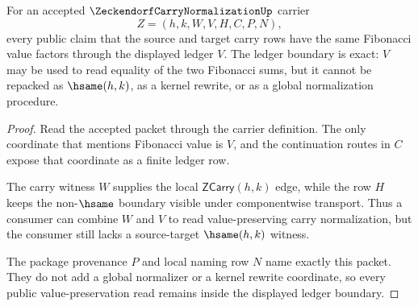 \begin{theorem}
\label{thm:zeckendorf-carry-normalization-value-ledger}
For an accepted $\ZeckendorfCarryNormalizationUp$ carrier
$$
Z=(h,k,W,V,H,C,P,N),
$$
every public claim that the source and target carry rows have the same
Fibonacci value factors through the displayed ledger $V$. The ledger boundary
is exact: $V$ may be used to read equality of the two Fibonacci sums, but it
cannot be repacked as $\hsame(h,k)$, as a kernel rewrite, or as a global
normalization procedure.
\end{theorem}
\begin{proof}
Read the accepted packet through the carrier definition. The only coordinate
that mentions Fibonacci value is $V$, and the continuation routes in $C$
expose that coordinate as a finite ledger row.

The carry witness $W$ supplies the local $\mathsf{ZCarry}(h,k)$ edge, while
the row $H$ keeps the non-$\hsame$ boundary visible under componentwise
transport. Thus a consumer can combine $W$ and $V$ to read value-preserving
carry normalization, but the consumer still lacks a source-target
$\hsame(h,k)$ witness.

The package provenance $P$ and local naming row $N$ name exactly this packet.
They do not add a global normalizer or a kernel rewrite coordinate, so every
public value-preservation read remains inside the displayed ledger boundary.
\end{proof}

